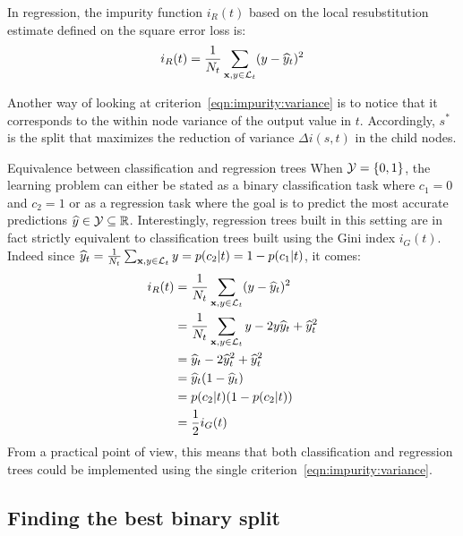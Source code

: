 \begin{definition}
In regression, the impurity function $i_R(t)$ based on the local resubstitution estimate
defined on the square error loss is:
\begin{equation}\label{eqn:impurity:variance}
i_R(t) = \frac{1}{N_t} \sum_{\mathbf{x}, y \in {\cal L}_t} (y - \widehat{y}_t)^2
\end{equation}
\end{definition}

Another way of looking at criterion~\ref{eqn:impurity:variance} is to notice
that it corresponds to the within node variance of the output value in $t$.
Accordingly, $s^*$ is the split that maximizes the reduction of variance
$\Delta i(s, t)$ in the child nodes.

\begin{remark}{Equivalence between classification and regression trees}
When ${\cal Y} = \{0, 1\}$, the learning problem can either be
stated as a binary classification task where $c_1=0$ and $c_2=1$ or as a regression
task where the goal is to predict the most accurate predictions $\widehat{y} \in {\cal Y} \subseteq \mathbb{R}$.
Interestingly, regression trees built in this setting are in fact strictly
equivalent to classification trees built using the Gini index $i_G(t)$. Indeed since $\widehat{y}_t = \tfrac{1}{N_t} \sum_{\mathbf{x}, y \in {\cal L}_t} y = p(c_2|t) = 1 - p(c_1|t)$, it comes:
\begin{align}
i_R(t) &= \frac{1}{N_t} \sum_{\mathbf{x}, y \in {\cal L}_t} (y - \widehat{y}_t)^2 \nonumber \\
       &= \frac{1}{N_t} \sum_{\mathbf{x}, y \in {\cal L}_t} y - 2 y \widehat{y}_t + \widehat{y}_t^2 \nonumber \\
       &= \widehat{y}_t - 2 \widehat{y}_t^2 + \widehat{y}_t^2 \nonumber \\
       &= \widehat{y}_t (1 - \widehat{y}_t) \nonumber \\
       &= p(c_2|t) (1 - p(c_2|t)) \nonumber \\
       &= \frac{1}{2} i_G(t)
\end{align}
From a practical point of view, this means that both classification and
regression trees could be implemented using the single criterion~\ref{eqn:impurity:variance}.
\end{remark}

\subsection{Finding the best binary split}

